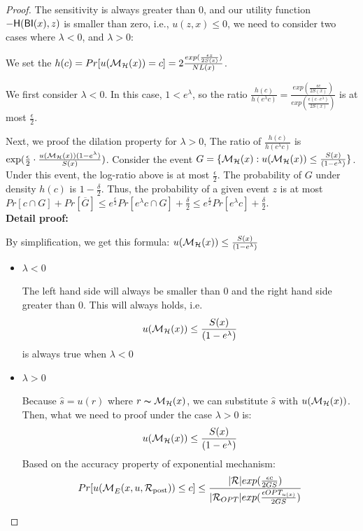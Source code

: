 \documentclass[sigconf]{acmart}
\begin{document}
\begin{proof}

The sensitivity is always greater than 0, and our utility function $-\mathsf{H}(\mathsf{BI}(x),z)$ is smaller than zero, i.e., $u(z,x) \leq 0$, we need to consider two cases where $\lambda < 0$, and $\lambda > 0$:

We set the $h(c) = Pr[u(\mathcal{M}_{\mathcal{H}}(x)) = c] = 2\frac{exp(\frac{\epsilon z}{2 S(x)})}{NL(x)}$.

We first consider $\lambda < 0$. In this case, $1 < e ^ {\lambda}$, so the ratio $\frac{h(c)}{h(e^{\lambda}c)} = \frac{exp(\frac{\epsilon c}{2 S(x)})}{exp(\frac{\epsilon (c \cdot e^{\lambda})}{2 S(x)})}$ is at most $\frac{\epsilon}{2}$.

Next, we proof the dilation property for $\lambda > 0$, The ratio of $\frac{h(c)}{h(e^{\lambda}c)}$ is $\exp(\frac{\epsilon}{2} \cdot \frac{u(\mathcal{M}_{\mathcal{H}}(x)) (1 - e^{\lambda})}{S(x)})$. Consider the event $G = \{ \mathcal{M}_{\mathcal{H}}(x) : u(\mathcal{M}_{\mathcal{H}}(x)) \leq \frac{S(x)}{(1 - e^{\lambda})}\}$. Under this event, the log-ratio above is at most $\frac{\epsilon}{2}$. The probability of $G$ under density $h(c)$ is $1 - \frac{\delta}{2}$. Thus, the probability of a given event $z$ is at most $Pr[c \cap G] + Pr[\overline{G}] \leq e^{\frac{\epsilon}{2}} Pr[e^{\lambda}c \cap G] + \frac{\delta}{2} \leq e^{\frac{\epsilon}{2}} Pr[e^{\lambda}c] + \frac{\delta}{2}$.\\


\textbf{Detail proof:}
	
	By simplification, we get this formula: $u(\mathcal{M}_{\mathcal{H}}(x)) \leq \frac{S(x)}{(1 - e ^ {\lambda})}$
\begin{itemize}
	\item $\lambda < 0$

		The left hand side will always be smaller than 0 and the right hand side greater than 0. This will always holds, i.e.
		\begin{equation*}
		u(\mathcal{M}_{\mathcal{H}}(x)) \leq \frac{S(x)}{(1 - e ^ {\lambda})}
		\end{equation*}
		is always true when $\lambda < 0$
	\item $\lambda > 0$


		Because $\hat{s} = u(r)$ where $r \thicksim \mathcal{M}_{\mathcal{H}}(x)$, we can substitute $\hat{s}$ with $u(\mathcal{M}_{\mathcal{H}}(x))$. Then, what we need to proof under the case $\lambda > 0$ is:
		\begin{equation}
		\label{eq_dilation_case2}
		u(\mathcal{M}_{\mathcal{H}}(x)) \leq \frac{S(x)}{(1 - e ^ {\lambda})}
		\end{equation}
		Based on the accuracy property of exponential mechanism:
		\begin{equation*}
		\begin{split}
		Pr[u(\mathcal{M}_E^{}({x},{u},{\mathcal{R}_{\textup{post}}})) \leq c] 
		& \leq \frac{|\mathcal{R}|exp(\frac{\epsilon c}{2 GS})}{|\mathcal{R}_{OPT}| exp(\frac{\epsilon OPT_{u(x)}}{2 GS})}\\
		\end{split}
		\end{equation*}


\end{itemize}
\end{proof}
\end{document}
